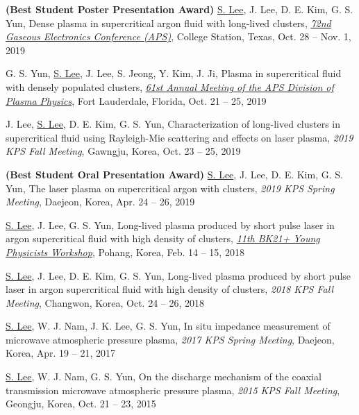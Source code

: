 \begin{conference}
    \item \textbf{(Best Student Poster Presentation Award)} \underline{S. Lee}, J. Lee, D. E. Kim, G. S. Yun, Dense plasma in supercritical argon fluid with long-lived clusters, \href{http://meetings.aps.org/Meeting/GEC19/Session/MW1.64}{\textit{72nd Gaseous Electronics Conference (APS)}}, College Station, Texas, Oct. 28 -- Nov. 1, 2019
    \item G. S. Yun, \underline{S. Lee}, J. Lee, S. Jeong, Y. Kim, J. Ji, Plasma in supercritical fluid with densely populated clusters, \href{https://meetings.aps.org/Meeting/DPP19/Session/YP10.67}{\textit{61st Annual Meeting of the APS Division of Plasma Physics}}, Fort Lauderdale, Florida, Oct. 21 -- 25, 2019
    \item J. Lee, \underline{S. Lee}, D. E. Kim, G. S. Yun, Characterization of long-lived clusters in supercritical fluid using Rayleigh-Mie scattering and effects on laser plasma, \textit{2019 KPS Fall Meeting}, Gawngju, Korea, Oct. 23 -- 25, 2019
    \item \textbf{(Best Student Oral Presentation Award)} \underline{S. Lee}, J. Lee, D. E. Kim, G. S. Yun, The laser plasma on supercritical argon with clusters, \textit{2019 KPS Spring Meeting}, Daejeon, Korea, Apr. 24 -- 26, 2019
    \item \underline{S. Lee}, J. Lee, G. S. Yun, Long-lived plasma produced by short pulse laser in argon supercritical fluid with high density of clusters, \href{http://ph.postech.ac.kr/~ypw11/program.html}{\textit{11th BK21+ Young Physicists Workshop}}, Pohang, Korea, Feb. 14 -- 15, 2018
    \item \underline{S. Lee}, J. Lee, D. E. Kim, G. S. Yun, Long-lived plasma produced by short pulse laser in argon supercritical fluid with high density of clusters, \textit{2018 KPS Fall Meeting}, Changwon, Korea, Oct. 24 -- 26, 2018
    \item \underline{S. Lee}, W. J. Nam, J. K. Lee, G. S. Yun, In situ impedance measurement of microwave atmospheric pressure plasma, \textit{2017 KPS Spring Meeting}, Daejeon, Korea, Apr. 19 -- 21, 2017
    \item \underline{S. Lee}, W. J. Nam, G. S. Yun, On the discharge mechanism of the coaxial transmission microwave atmospheric pressure plasma, \textit{2015 KPS Fall Meeting}, Geongju, Korea, Oct. 21 -- 23, 2015
\end{conference}
